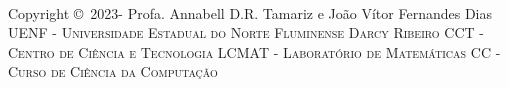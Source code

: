 \newpage
~\vfill
\thispagestyle{empty}

\noindent Copyright \copyright\ 2023-\the\year{} Profa. Annabell D.R. Tamariz e João Vítor Fernandes Dias  %
\noindent \textsc{UENF - Universidade Estadual do Norte Fluminense Darcy Ribeiro} %
\noindent \textsc{CCT - Centro de Ciência e Tecnologia} %
\noindent \textsc{LCMAT - Laboratório de Matemáticas} %
\noindent \textsc{CC - Curso de Ciência da Computação} %

